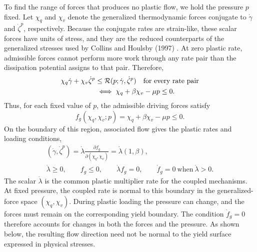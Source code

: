 \documentclass[11pt]{article}
\begin{document}
To find the range of forces that produces no plastic flow, we hold the
pressure \(p\) fixed. Let \(\chi_q\) and \(\chi_v\)
denote the generalized thermodynamic forces conjugate to \(\dot\gamma\) and
\(\dot\zeta^p\), respectively.  Because the conjugate rates are strain-like,
these scalar forces have units of stress, and they are the reduced
counterparts of the generalized stresses used by Collins and Houlsby (1997)
\cite[eqs.~(2.10)--(2.11) and (5.11)--(5.13)]{collins1997}.
At zero plastic rate, admissible forces cannot perform more work through any
rate pair than the dissipation potential assigns to that pair.  Therefore,
\begin{align}
	\chi_q\dot\gamma+\chi_v\dot\zeta^p
	 & \le\mathcal R(p;\dot\gamma,\dot\zeta^p)
	\quad\text{for every rate pair}
	\notag                                     \\
	 & \iff
	\chi_q+\beta\chi_v-\mu p\le0.
	\label{eq:zero_rate_force_condition}
\end{align}
Thus, for each fixed value of \(p\), the admissible driving forces satisfy
\begin{equation}
	f_g(\chi_q,\chi_v;p)
	=\chi_q+\beta\chi_v-\mu p
	\le0.
	\label{eq:generalized_yield}
\end{equation}
On the boundary of this region, associated flow gives the plastic rates and
loading conditions,
\begin{equation}
	\begin{gathered}
		(\dot\gamma,\dot\zeta^p)
		=\dot\lambda\frac{\partial f_g}{\partial(\chi_q,\chi_v)}
		=\dot\lambda(1,\beta), \\
		\dot\lambda\ge0,
		\qquad
		f_g\le0,
		\qquad
		\dot\lambda f_g=0,
		\qquad
		\dot f_g=0\ \text{when}\ \dot\lambda>0.
	\end{gathered}
	\label{eq:generalized_loading_conditions}
\end{equation}
The scalar \(\dot\lambda\) is the common plastic multiplier rate for the
coupled mechanisms.
At fixed pressure, the coupled rate is normal to this boundary in the
generalized-force space \((\chi_q,\chi_v)\). During plastic loading the
pressure can change, and the forces must remain on the corresponding yield
boundary. The condition \(\dot f_g=0\) therefore accounts for changes in both
the forces and the pressure. As shown below, the resulting flow direction need
not be normal to the yield surface expressed in physical stresses.
\end{document}
